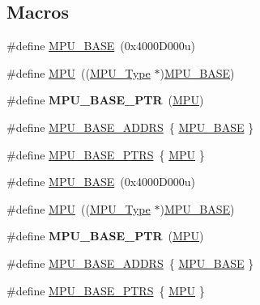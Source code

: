 \subsection*{Macros}
\begin{DoxyCompactItemize}
\item 
\#define \hyperlink{group__MPU__Peripheral__Access__Layer_gaa0805ccd2bc4e42d63adb0618d2af571}{M\+P\+U\+\_\+\+B\+A\+SE}~(0x4000\+D000u)
\item 
\#define \hyperlink{group__MPU__Peripheral__Access__Layer_gaad8182e72fe5037a6ba1eb65a1554e0b}{M\+PU}~((\hyperlink{structMPU__Type}{M\+P\+U\+\_\+\+Type} $\ast$)\hyperlink{group__MPU__Peripheral__Access__Layer_gaa0805ccd2bc4e42d63adb0618d2af571}{M\+P\+U\+\_\+\+B\+A\+SE})
\item 
\#define {\bfseries M\+P\+U\+\_\+\+B\+A\+S\+E\+\_\+\+P\+TR}~(\hyperlink{group__MPU__Peripheral__Access__Layer_gaad8182e72fe5037a6ba1eb65a1554e0b}{M\+PU})\hypertarget{group__MPU__Peripheral__Access__Layer_gae2d60f80178d84225d77e5f0214d1f1d}{}\label{group__MPU__Peripheral__Access__Layer_gae2d60f80178d84225d77e5f0214d1f1d}

\item 
\#define \hyperlink{group__MPU__Peripheral__Access__Layer_ga05c682e671650e23a7103fb69e46ce86}{M\+P\+U\+\_\+\+B\+A\+S\+E\+\_\+\+A\+D\+D\+RS}~\{ \hyperlink{group__MPU__Peripheral__Access__Layer_gaa0805ccd2bc4e42d63adb0618d2af571}{M\+P\+U\+\_\+\+B\+A\+SE} \}
\item 
\#define \hyperlink{group__MPU__Peripheral__Access__Layer_ga78460c4504e0b1effc8715d3fdb92f25}{M\+P\+U\+\_\+\+B\+A\+S\+E\+\_\+\+P\+T\+RS}~\{ \hyperlink{group__MPU__Peripheral__Access__Layer_gaad8182e72fe5037a6ba1eb65a1554e0b}{M\+PU} \}
\item 
\#define \hyperlink{group__MPU__Peripheral__Access__Layer_gaa0805ccd2bc4e42d63adb0618d2af571}{M\+P\+U\+\_\+\+B\+A\+SE}~(0x4000\+D000u)
\item 
\#define \hyperlink{group__MPU__Peripheral__Access__Layer_gaad8182e72fe5037a6ba1eb65a1554e0b}{M\+PU}~((\hyperlink{structMPU__Type}{M\+P\+U\+\_\+\+Type} $\ast$)\hyperlink{group__MPU__Peripheral__Access__Layer_gaa0805ccd2bc4e42d63adb0618d2af571}{M\+P\+U\+\_\+\+B\+A\+SE})
\item 
\#define {\bfseries M\+P\+U\+\_\+\+B\+A\+S\+E\+\_\+\+P\+TR}~(\hyperlink{group__MPU__Peripheral__Access__Layer_gaad8182e72fe5037a6ba1eb65a1554e0b}{M\+PU})\hypertarget{group__MPU__Peripheral__Access__Layer_gae2d60f80178d84225d77e5f0214d1f1d}{}\label{group__MPU__Peripheral__Access__Layer_gae2d60f80178d84225d77e5f0214d1f1d}

\item 
\#define \hyperlink{group__MPU__Peripheral__Access__Layer_ga05c682e671650e23a7103fb69e46ce86}{M\+P\+U\+\_\+\+B\+A\+S\+E\+\_\+\+A\+D\+D\+RS}~\{ \hyperlink{group__MPU__Peripheral__Access__Layer_gaa0805ccd2bc4e42d63adb0618d2af571}{M\+P\+U\+\_\+\+B\+A\+SE} \}
\item 
\#define \hyperlink{group__MPU__Peripheral__Access__Layer_ga78460c4504e0b1effc8715d3fdb92f25}{M\+P\+U\+\_\+\+B\+A\+S\+E\+\_\+\+P\+T\+RS}~\{ \hyperlink{group__MPU__Peripheral__Access__Layer_gaad8182e72fe5037a6ba1eb65a1554e0b}{M\+PU} \}
\end{DoxyCompactItemize}
